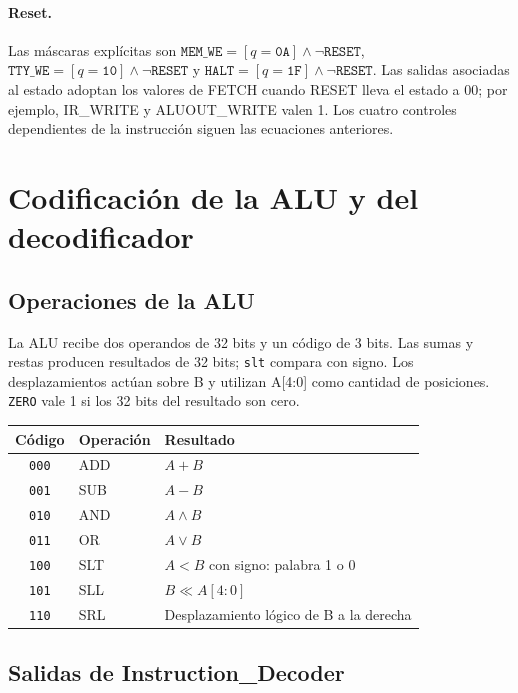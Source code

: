 \documentclass[11pt,a4paper]{article}
\newcommand{\sig}[1]{\texttt{#1}}
\begin{document}
\paragraph{Reset.} Las máscaras explícitas son
$\sig{MEM\_WE}=[q=\sig{0A}]\land\neg\sig{RESET}$,
$\sig{TTY\_WE}=[q=\sig{10}]\land\neg\sig{RESET}$ y
$\sig{HALT}=[q=\sig{1F}]\land\neg\sig{RESET}$.
Las salidas asociadas al estado adoptan los valores de FETCH cuando RESET
lleva el estado a 00; por ejemplo, IR\_WRITE y ALUOUT\_WRITE valen 1.
Los cuatro controles dependientes de la instrucción siguen las ecuaciones anteriores.

\clearpage
\section{Codificación de la ALU y del decodificador}

\subsection{Operaciones de la ALU}

La ALU recibe dos operandos de 32 bits y un código de 3 bits. Las sumas y
restas producen resultados de 32 bits; \sig{slt} compara con signo. Los
desplazamientos actúan sobre B y utilizan A[4:0] como cantidad de posiciones.
\sig{ZERO} vale 1 si los 32 bits del resultado son cero.

\begin{center}\small
\begin{tabular}{@{}cll@{}}
\toprule Código & Operación & Resultado \\\midrule
\sig{000} & ADD & $A+B$ \\
\sig{001} & SUB & $A-B$ \\
\sig{010} & AND & $A\land B$ \\
\sig{011} & OR & $A\lor B$ \\
\sig{100} & SLT & $A<B$ con signo: palabra 1 o 0 \\
\sig{101} & SLL & $B\ll A[4{:}0]$ \\
\sig{110} & SRL & Desplazamiento lógico de B a la derecha \\
\bottomrule
\end{tabular}
\end{center}

\subsection{Salidas de Instruction\_Decoder}
\end{document}
